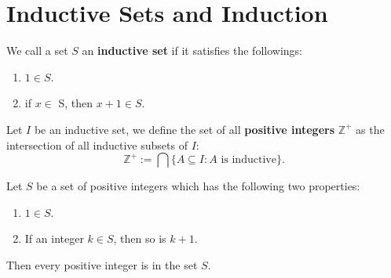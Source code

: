 	\section{Inductive Sets and Induction}
	\begin{definitionenv}
		We call a set $S$ an \textbf{inductive set} if it satisfies the followings:
		\begin{enumerate}
			\item $1\in S$. 
			\item if $x\in$ S, then $x+1 \in S$.
		\end{enumerate}
	\end{definitionenv}
    \begin{definitionenv}
        Let $I$ be an inductive set, we define the set of all \textbf{positive integers} \(\mathbb{Z}^+\) as the intersection of all inductive subsets of \(I\):
		$$
			\mathbb{Z}^+ := \bigcap\{A\subseteq I: A \text{ is inductive}\}.
		$$
    \end{definitionenv}
	\begin{theoremenv}\label{pcp_ind}
		Let $S$ be a set of positive integers which has the following two properties:
		\begin{enumerate}
			\item $1\in S$.
			\item If an integer $k \in S$, then so is $k+1$.
		\end{enumerate}
		Then every positive integer is in the set $S$.
	\end{theoremenv}
